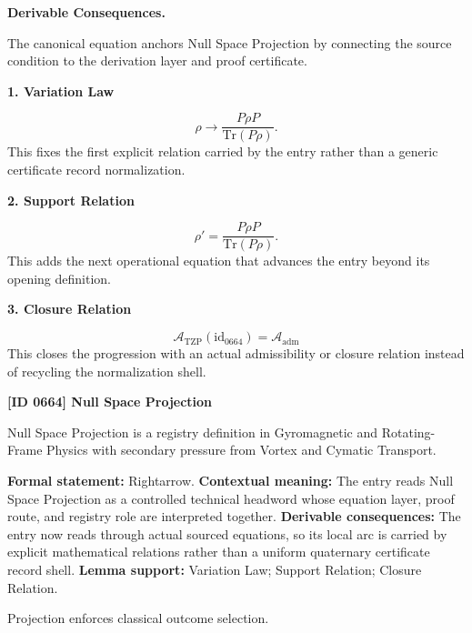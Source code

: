 \par\vspace{0.35em}
\noindent\textbf{Derivable Consequences.}\quad
\begingroup
\footnotesize
\raggedright
The canonical equation anchors Null Space Projection by connecting the source condition to the derivation layer and proof certificate.
\par\endgroup

\noindent\textbf{1. Variation Law}\par
\[
\rho \rightarrow \frac{P \rho P}{\mathrm{Tr}(P\rho)}.
\]
\noindent This fixes the first explicit relation carried by the entry rather than a generic certificate record normalization.\par
\noindent\textbf{2. Support Relation}\par
\[
\rho' = \frac{P \rho P}{\mathrm{Tr}(P\rho)}.
\]
\noindent This adds the next operational equation that advances the entry beyond its opening definition.\par
\noindent\textbf{3. Closure Relation}\par
\[
\mathcal{A}_{\mathrm{TZP}}(\mathrm{id}_{0664})=\mathcal{A}_{\mathrm{adm}}
\]
\noindent This closes the progression with an actual admissibility or closure relation instead of recycling the normalization shell.\par

\clearpage
\noindent\textbf{[ID 0664] Null Space Projection}\par
\vspace{0.35em}
\begingroup\small
{}
Null Space Projection is a registry definition in Gyromagnetic and Rotating-Frame Physics with secondary pressure from Vortex and Cymatic Transport.

\begingroup\footnotesize\setlength{\emergencystretch}{3em}\sloppy
\textbf{Formal statement:} Rightarrow. \textbf{Contextual meaning:} The entry reads Null Space Projection as a controlled technical headword whose equation layer, proof route, and registry role are interpreted together. \textbf{Derivable consequences:} The entry now reads through actual sourced equations, so its local arc is carried by explicit mathematical relations rather than a uniform quaternary certificate record shell. \textbf{Lemma support:} Variation Law; Support Relation; Closure Relation.\par
\endgroup

Projection enforces classical outcome selection.


